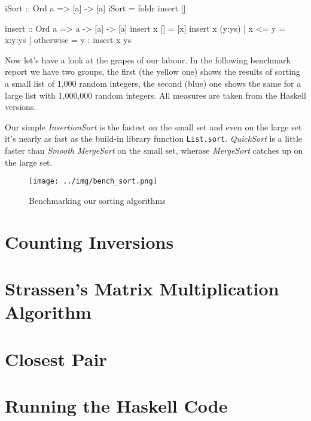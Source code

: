 \begin{impl}
\end{impl}

\begin{haskellcode}
  iSort :: Ord a => [a] -> [a]
  iSort = foldr insert []

  insert :: Ord a => a -> [a] -> [a]
  insert x [] = [x]
  insert x (y:ys) | x <= y = x:y:ys
                  | otherwise = y : insert x ys
\end{haskellcode}

Now let's have a look at the grapes of our labour.
In the following benchmark report we have two groups, the first (the yellow one) shows the results of sorting a small list of 1,000 random integers, the second (blue) one shows the same for a large list with 1,000,000 random integers. All measures are taken from the Haskell versions.

Our simple \emph{InsertionSort} is the fastest on the small set and even on the large set it's nearly as fast as the build-in library function \texttt{List.sort}.
\emph{QuickSort} is a little faster than \emph{Smooth MergeSort} on the small set, wherase \emph{MergeSort} catches up on the large set.

\begin{figure}[h]
\centering
\texttt{[image: ../img/bench\_sort.png]}
\caption[Sorting benchmarks]{Benchmarking our sorting algorithms}
\end{figure}

\section{Counting Inversions}

\section{Strassen's Matrix Multiplication Algorithm}

\section{Closest Pair}

\section{Running the Haskell Code}

